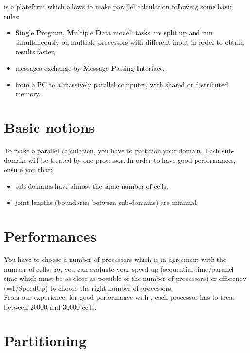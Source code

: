 \trust is a plateform which allows to make parallel calculation following some basic rules:
\begin{itemize}
\item \textbf{S}ingle \textbf{P}rogram, \textbf{M}ultiple \textbf{D}ata model: tasks are split up and run simultaneously on multiple processors with different input in order to obtain results faster,
\item messages exchange by \textbf{M}essage \textbf{P}assing \textbf{I}nterface,
\item from a PC to a massively parallel computer, with shared or distributed memory.
\end{itemize}


\section{Basic notions}
To make a parallel calculation, you have to partition your domain.
Each sub-domain will be treated by one processor.
In order to have good performances, ensure you that:
\begin{itemize}
\item sub-domains have almost the same number of cells,
\item joint lengths (boundaries between sub-domains) are minimal,
\end{itemize}



\section{Performances}
You have to choose a number of processors which is in agreement with the number of cells.
So, you can evaluate your speed-up (sequential time/parallel time which must be as close as possible of the number of processors) or efficiency (=1/SpeedUp) to choose the right number of processors.\\

From our experience, for good performance with \trust, each processor has to treat between 20000 and 30000 cells.



\section{Partitioning}

